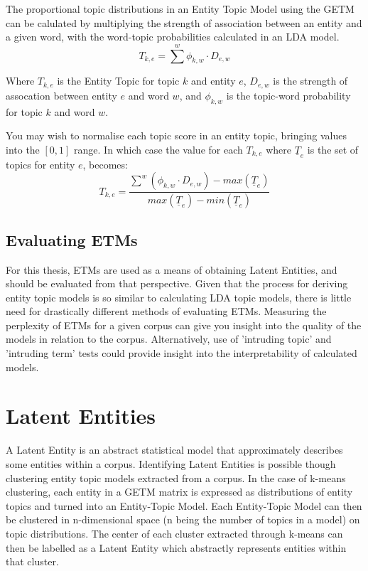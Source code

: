 \documentclass[10pt]{report}
\begin{document}
The proportional topic distributions in an Entity Topic Model using the GETM can be calulated by multiplying the strength of association between an entity and a given word, with the word-topic probabilities calculated in an LDA model.
\[
  T_{k,e} = \sum^w \phi_{k,w} \cdot D_{e,w}
\]

Where  \(T_{k,e}\) is the Entity Topic for topic \(k\) and entity \(e\), \(D_{e,w}\) is the strength of assocation between entity \(e\) and word \(w\), and \(\phi_{k,w}\) is the topic-word probability for topic \(k\) and word \(w\).

You may wish to normalise each topic score in an entity topic, bringing values into the \([0,1]\) range. In which case the value for each \(T_{k,e}\) where \(\underline{T}_e\) is the set of topics for entity \(e\), becomes:
\[
  T_{k,e} = \frac{\sum^w {(\phi_{k,w} \cdot D_{e,w})} - max(\underline{T}_e)}{ max(\underline{T}_e) - min(\underline{T}_e)}
\]

\subsection{Evaluating ETMs}
For this thesis, ETMs are used as a means of obtaining Latent Entities, and should be evaluated from that perspective. Given that the process for deriving entity topic models is so similar to calculating LDA topic models, there is little need for drastically different methods of evaluating ETMs. Measuring the perplexity of ETMs for a given corpus can give you insight into the quality of the models in relation to the corpus. Alternatively, use of 'intruding topic' and 'intruding term' tests could provide insight into the interpretability of calculated models.

\section{Latent Entities}
A Latent Entity is an abstract statistical model that approximately describes some entities within a corpus. Identifying Latent Entities is possible though clustering entity topic models extracted from a corpus. In the case of k-means clustering, each entity in a GETM matrix is expressed as distributions of entity topics and turned into an Entity-Topic Model. Each Entity-Topic Model can then be clustered in n-dimensional space (n being the number of topics in a model) on topic distributions. The center of each cluster extracted through k-means can then be labelled as a Latent Entity which abstractly represents entities within that cluster.
\end{document}

